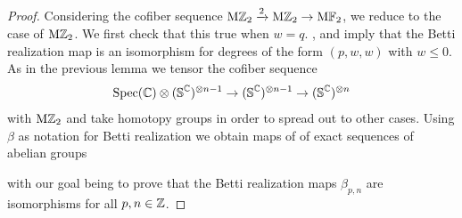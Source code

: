 \begin{proof}
    Considering the cofiber sequence $\mathrm{M}\mathbb{Z}_{2} \xrightarrow{2} \mathrm{M}\mathbb{Z}_{2} \to \mathrm{M}\mathbb{F}_2$, we reduce to the case of $\mathrm{M}\mathbb{Z}_{2}$. We first check that this true when $w=q$.
  ,  and  imply that the Betti realization map is an isomorphism for degrees of the form $(p,w,w)$ with $ w \leq 0$.
  As in the previous lemma we tensor the cofiber sequence
  \[ \operatorname{\mathrm{Spec}}(\mathbb{C}) \otimes (\operatorname{\mathbb{S}}^{\mathbb{C}})^{\otimes n-1} \to (\operatorname{\mathbb{S}}^{\mathbb{C}})^{\otimes n-1} \to (\operatorname{\mathbb{S}}^{\mathbb{C}})^{\otimes n} \]
  with $\mathrm{M}\mathbb{Z}_{2}$ and take homotopy groups in order to spread out to other cases. 
  Using $\beta$ as notation for Betti realization we obtain maps of of exact sequences of abelian groups
  \begin{center}
  \end{center}
  with our goal being to prove that the Betti realization maps $\beta_{p,n}$ are isomorphisms for all $p,n \in \mathbb{Z}$.


\end{proof}
